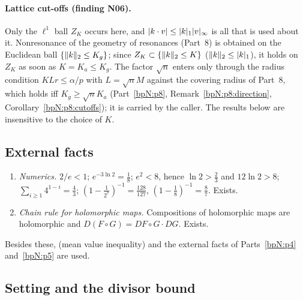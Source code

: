 \paragraph{Lattice cut-offs (finding N06).} Only the $\ell^1$ ball $Z_K$ occurs here, and $\lvert k\cdot v\rvert\le\lvert k\rvert_1\lvert v\rvert_\infty$ is all that is used about it. Nonresonance of the geometry of resonances (Part~8) is obtained on the Euclidean ball $\{\lVert k\rVert_2\le K_g\}$; since $Z_{K}\subset\{\lVert k\rVert_2\le K\}$ ($\lVert k\rVert_2\le\lvert k\rvert_1$), it holds on $Z_K$ as soon as $K=K_a\le K_g$. The factor $\sqrt n$ enters only through the radius condition $KLr\le\alpha/p$ with $L=\sqrt nM$ against the covering radius of Part~8, which holds iff $K_g\ge\sqrt nK_a$ (Part~\ref{bpN:p8}, Remark~\ref{bpN:p8:direction}, Corollary~\ref{bpN:p8:cutoffs}); it is carried by the caller. The results below are insensitive to the choice of $K$.

\subsection{External facts}\label{bpN:p6:s-ext}
\begin{enumerate}[label=(E\arabic*),leftmargin=2.2em]
\item\label{bpN:p6:ext-numerics} \emph{Numerics.} $2/e<1$; $e^{-3\ln2}=\tfrac18$; $e^2<8$, hence $\ln2>\tfrac23$ and $12\ln2>8$; $\sum_{i\ge1}4^{1-i}=\tfrac43$; $(1-\tfrac1{2^7})^{-1}=\tfrac{128}{127}$, $(1-\tfrac18)^{-1}=\tfrac87$. Exists.
\item\label{bpN:p6:ext-chain} \emph{Chain rule for holomorphic maps.} Compositions of holomorphic maps are holomorphic and $D(F\circ G)=DF\circ G\cdot DG$. Exists.
\end{enumerate}
Besides these,  (mean value inequality) and the external facts of Parts~\ref{bpN:p4} and~\ref{bpN:p5} are used.

\subsection{Setting and the divisor bound}\label{bpN:p6:s-setting}

